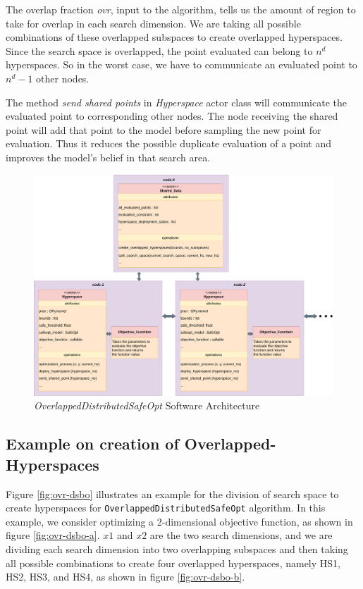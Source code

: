 The overlap fraction \textit{ovr}, input to the algorithm, tells us the amount of region to take for overlap in each search dimension. We are taking all possible combinations of these overlapped subspaces to create overlapped hyperspaces. Since the search space is overlapped, the point evaluated can belong to $n^d$ hyperspaces. So in the worst case, we have to communicate an evaluated point to $n^d-1$ other nodes.

The method \textit{send shared points} in \textit{Hyperspace} actor class will communicate the evaluated point to corresponding other nodes. The node receiving the shared point will add that point to the model before sampling the new point for evaluation. Thus it reduces the possible duplicate evaluation of a point and improves the model's belief in that search area.

\begin{figure}[H]
	\centering
	\hspace*{-6em}
	\includegraphics[scale=0.28]{figures/ovr-dbo-architecture.pdf}
	\caption{\textit{OverlappedDistributedSafeOpt} Software Architecture}
	\label{fig:ovr-dsbo-architecture}
\end{figure}

\subsection{Example on creation of Overlapped-Hyperspaces}
Figure \ref{fig:ovr-dsbo} illustrates an example for the division of search space to create hyperspaces for \texttt{OverlappedDistributedSafeOpt} algorithm. In this example, we consider optimizing a 2-dimensional objective function, as shown in figure \ref{fig:ovr-dsbo-a}. $x1$ and $x2$ are the two search dimensions, and we are dividing each search dimension into two overlapping subspaces and then taking all possible combinations to create four overlapped hyperspaces, namely HS1, HS2, HS3, and HS4, as shown in figure \ref{fig:ovr-dsbo-b}. 

